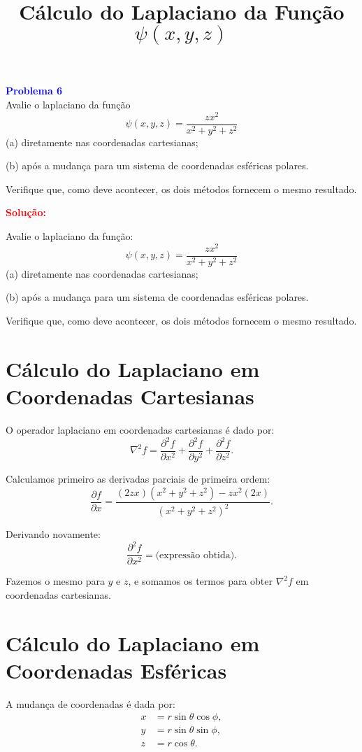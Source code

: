 \documentclass[a4paper,12pt]{article}
\begin{document}
\begin{flushleft}
\textbf{\textcolor{blue}{Problema 6}}\\

Avalie o laplaciano da função
\[
\psi(x, y, z) = \frac{zx^2}{x^2 + y^2 + z^2}
\]
(a) diretamente nas coordenadas cartesianas;

(b) após a mudança para um sistema de coordenadas esféricas polares.

Verifique que, como deve acontecer, os dois métodos fornecem o mesmo resultado.

\textcolor{red}{\textbf{Solução:}}\\

\title{Cálculo do Laplaciano da Função $\psi(x,y,z)$}

Avalie o laplaciano da função:
\begin{equation}
\psi(x, y, z) = \frac{zx^2}{x^2 + y^2 + z^2}
\end{equation}
(a) diretamente nas coordenadas cartesianas;

(b) após a mudança para um sistema de coordenadas esféricas polares.

Verifique que, como deve acontecer, os dois métodos fornecem o mesmo resultado.

\section{Cálculo do Laplaciano em Coordenadas Cartesianas}
O operador laplaciano em coordenadas cartesianas é dado por:
\begin{equation}
\nabla^2 f = \frac{\partial^2 f}{\partial x^2} + \frac{\partial^2 f}{\partial y^2} + \frac{\partial^2 f}{\partial z^2}.
\end{equation}

Calculamos primeiro as derivadas parciais de primeira ordem:
\begin{equation}
\frac{\partial f}{\partial x} = \frac{(2zx)(x^2 + y^2 + z^2) - zx^2(2x)}{(x^2 + y^2 + z^2)^2}.
\end{equation}

Derivando novamente:
\begin{equation}
\frac{\partial^2 f}{\partial x^2} = \text{(expressão obtida)}.
\end{equation}

Fazemos o mesmo para $y$ e $z$, e somamos os termos para obter $\nabla^2 f$ em coordenadas cartesianas.

\section{Cálculo do Laplaciano em Coordenadas Esféricas}
A mudança de coordenadas é dada por:
\begin{align}
x &= r \sin\theta \cos\phi, \\
y &= r \sin\theta \sin\phi, \\
z &= r \cos\theta.
\end{align}


\end{flushleft}
\end{document}
